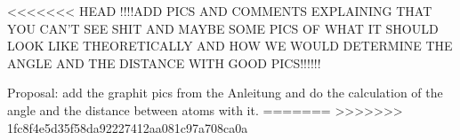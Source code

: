 
<<<<<<< HEAD
!!!!ADD PICS AND COMMENTS EXPLAINING THAT YOU CAN'T SEE SHIT AND MAYBE SOME PICS OF WHAT IT SHOULD LOOK LIKE THEORETICALLY AND HOW WE WOULD DETERMINE THE ANGLE AND THE DISTANCE WITH GOOD PICS!!!!!!

Proposal: add the graphit pics from the Anleitung and do the calculation of the angle and the distance between atoms with it.
=======
>>>>>>> 1fc8f4e5d35f58da92227412aa081c97a708ca0a
